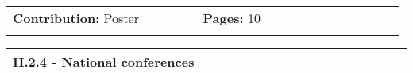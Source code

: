 \documentclass[11pt, letterpaper]{extarticle}
\begin{document}
\begin{longtable}{L{0.490\linewidth}L{0.490\linewidth}N}
		\textbf{Contribution:} Poster                                                                                                                          & \textbf{Pages:} 10                                                                                                                                     & \\[0.40cm]
		                                                                                                                                                       &                                                                                                                                                        & \\[-0.25cm] \hline
	\end{longtable}


	\label{sec:II.2.4.}
	\begin{longtable}{L{1.012\linewidth}N}
		\textbf{\large II.2.4 - National conferences} & \\[0.60cm] \hline
	\end{longtable}
\end{document}
